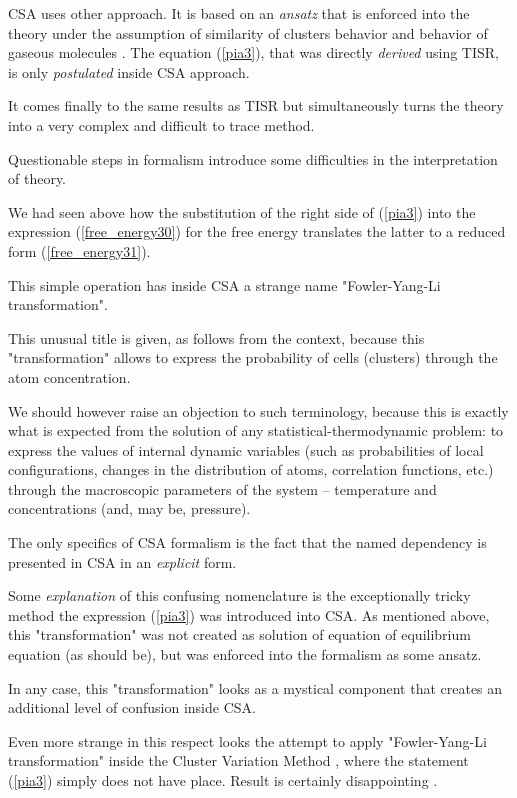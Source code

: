 \documentclass[12pt,abstract]{scrartcl}
\begin{document}
CSA uses other approach.
It is based on an \textit{ansatz} that is enforced into the theory under the assumption of similarity  of clusters behavior and behavior of gaseous molecules  \cite{Yang1945, Yang1947, li1949quasi}. 
The equation (\ref{pia3}), that was directly \textit{derived} using TISR,  is only \textit{postulated} inside CSA approach.

It comes finally to the same results as TISR but simultaneously  turns the theory into a very complex and difficult to trace method. 

Questionable steps in formalism introduce some difficulties in the interpretation of theory.

We had seen above how the substitution of the right side of (\ref{pia3}) into the  expression (\ref{free_energy30}) for the free energy translates the latter to a reduced form (\ref{free_energy31}).

This simple operation has inside CSA \cite{oates2007, zereg2009, Bourki2010} a strange  name "Fowler-Yang-Li transformation".

This unusual title is given, as follows from the context, because this "transformation" allows to express the  probability of cells (clusters) through the atom concentration.

We should however raise an objection to such terminology, because  this is exactly what is expected from the solution of any statistical-thermodynamic problem: to express the  values of internal dynamic variables (such as probabilities of local configurations, changes in the distribution of atoms, correlation functions, etc.) through the macroscopic parameters of the system -- temperature and concentrations (and, may be, pressure).

The only specifics of CSA formalism is the fact that the named dependency is presented in CSA in an \textit{explicit} form.

Some \textit{explanation} of this confusing nomenclature is the exceptionally tricky method the expression (\ref{pia3}) was introduced into CSA.
As mentioned above, this "transformation" was not created as solution of equation of  equilibrium equation (as should be), but was  enforced into the formalism as some ansatz.

In any case, this "transformation" looks as a mystical component that creates an  additional level of confusion inside CSA.

Even more strange in this respect looks the attempt to apply "Fowler-Yang-Li transformation" inside the Cluster Variation Method \cite{moran2012}, where the statement (\ref{pia3})  simply does not have place. 
Result is certainly disappointing  \cite{oates2007}.
\end{document}
